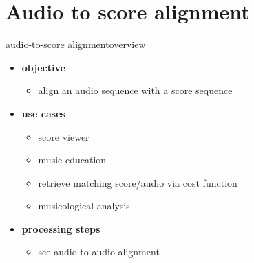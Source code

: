     \section[A2S]{Audio to score alignment}
        \begin{frame}{audio-to-score alignment}{overview}
            \begin{itemize}
                \item   \textbf{objective}
                    \begin{itemize}
                        \item align an audio sequence with a score sequence
                    \end{itemize}
                \bigskip
                \item<2->   \textbf{use cases}
                    \begin{itemize}
                        \item   score viewer
                        \item   music education
                        \item   retrieve matching score/audio via cost function
                        \item   musicological analysis
                    \end{itemize}
                \bigskip
                \item<3->   \textbf{processing steps}
                    \begin{itemize}
                        \item   see audio-to-audio alignment
                    \end{itemize}
            \end{itemize}
        \end{frame}
